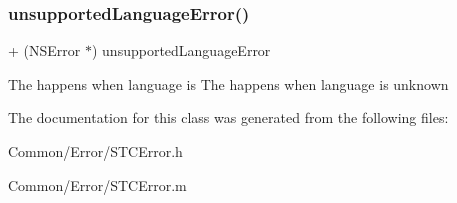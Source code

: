 \subsubsection{\texorpdfstring{unsupported\+Language\+Error()}{unsupportedLanguageError()}}
{\footnotesize\ttfamily + (N\+S\+Error $\ast$) unsupported\+Language\+Error \begin{DoxyParamCaption}{ }\end{DoxyParamCaption}}

The happens when language is The happens when language is unknown 

The documentation for this class was generated from the following files\+:\begin{DoxyCompactItemize}
\item 
Common/\+Error/S\+T\+C\+Error.\+h\item 
Common/\+Error/S\+T\+C\+Error.\+m\end{DoxyCompactItemize}
